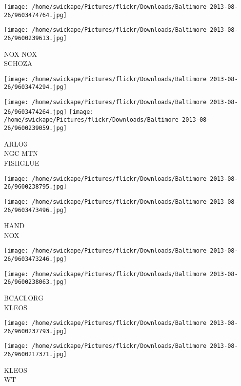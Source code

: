 \documentclass[10pt,letterpaper]{article}
\begin{document}
\texttt{[image: /home/swickape/Pictures/flickr/Downloads/Baltimore 2013-08-26/9603474764.jpg]}

\vspace{0.25in}
\texttt{[image: /home/swickape/Pictures/flickr/Downloads/Baltimore 2013-08-26/9600239613.jpg]}

NOX NOX\\
SCHOZA\\
\pagebreak

\texttt{[image: /home/swickape/Pictures/flickr/Downloads/Baltimore 2013-08-26/9603474294.jpg]}

\vspace{0.25in}
\texttt{[image: /home/swickape/Pictures/flickr/Downloads/Baltimore 2013-08-26/9603474264.jpg]}
\texttt{[image: /home/swickape/Pictures/flickr/Downloads/Baltimore 2013-08-26/9600239059.jpg]}

ARLO3\\
NGC MTN\\
FISHGLUE\\
\pagebreak

\texttt{[image: /home/swickape/Pictures/flickr/Downloads/Baltimore 2013-08-26/9600238795.jpg]}

\vspace{0.25in}
\texttt{[image: /home/swickape/Pictures/flickr/Downloads/Baltimore 2013-08-26/9603473496.jpg]}

HAND\\
NOX\\
\pagebreak

\texttt{[image: /home/swickape/Pictures/flickr/Downloads/Baltimore 2013-08-26/9603473246.jpg]}

\vspace{0.25in}
\texttt{[image: /home/swickape/Pictures/flickr/Downloads/Baltimore 2013-08-26/9600238063.jpg]}

BCACI.ORG\\
KLEOS\\
\pagebreak

\texttt{[image: /home/swickape/Pictures/flickr/Downloads/Baltimore 2013-08-26/9600237793.jpg]}

\vspace{0.25in}
\texttt{[image: /home/swickape/Pictures/flickr/Downloads/Baltimore 2013-08-26/9600217371.jpg]}

KLEOS\\
WT\\
\pagebreak
\end{document}
